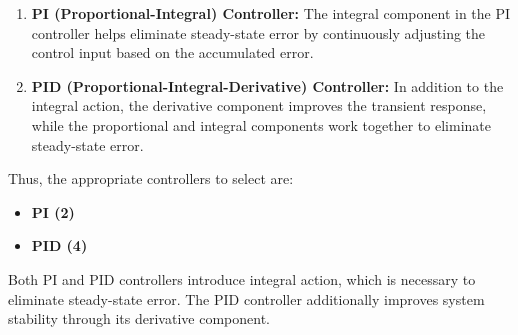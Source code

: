 \documentclass{article}
\begin{document}
\begin{enumerate}
    \item \textbf{PI (Proportional-Integral) Controller:} The integral component in the PI controller helps eliminate steady-state error by continuously adjusting the control input based on the accumulated error.
    
    \item \textbf{PID (Proportional-Integral-Derivative) Controller:} In addition to the integral action, the derivative component improves the transient response, while the proportional and integral components work together to eliminate steady-state error.
\end{enumerate}

\noindent
Thus, the appropriate controllers to select are:
\begin{itemize}
    \item \textbf{PI (2)}
    \item \textbf{PID (4)}
\end{itemize}

\noindent
Both PI and PID controllers introduce integral action, which is necessary to eliminate steady-state error. The PID controller additionally improves system stability through its derivative component.
\end{document}
